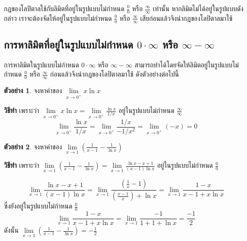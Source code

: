 \documentclass[
]{book}
\theoremstyle{definition}
\theoremstyle{definition}
\newtheorem{example}{ตัวอย่าง}[chapter]
\theoremstyle{definition}
\theoremstyle{definition}
\theoremstyle{remark}
\begin{document}
กฎของโลปิตาลใช้กับลิมิตที่อยู่ในรูปแบบไม่กำหนด \(\displaystyle \frac{0}{0}\) หรือ
\(\displaystyle \frac{\infty }{\infty }\) เท่านั้น หากลิมิตไม่ได้อยู่ในรูปแบบดังกล่าว
เราจะต้องจัดให้อยู่ในรูปแบบไม่กำหนด \(\displaystyle \frac{0}{0}\) หรือ
\(\displaystyle \frac{\infty
}{\infty }\) เสียก่อนแล้วจึงนำกฎของโลปิตาลมาใช้

\subsection{\texorpdfstring{การหาลิมิตที่อยู่ในรูปแบบไม่กำหนด \(0\cdot \infty\) หรือ \(\infty
-\infty\)}{การหาลิมิตที่อยู่ในรูปแบบไม่กำหนด 0\textbackslash cdot \textbackslash infty หรือ \textbackslash infty
-\textbackslash infty}}\label{uxe01uxe32uxe23uxe2buxe32uxe25uxe21uxe15uxe17uxe2duxe22uxe43uxe19uxe23uxe1buxe41uxe1auxe1auxe44uxe21uxe01uxe33uxe2buxe19uxe14-0cdot-infty-uxe2buxe23uxe2d-infty--infty}

การหาลิมิตในรูปแบบไม่กำหนด \(0\cdot \infty\) หรือ \(\infty -\infty\)
สามารถทำได้โดยจัดให้ลิมิตอยู่ในรูปแบบไม่กำหนด \(\displaystyle \frac{0}{0}\) หรือ
\(\displaystyle \frac{\infty }{\infty }\) ก่อนแล้วจึงนำกฎของโลปิตาลมาใช้
ดังตัวอย่างต่อไปนี้

\begin{example}
จงหาค่าของ \(\mathop {\lim }\limits_{x\to 0^+} x\ln x\)
\end{example}

\textbf{วิธีทำ} เพราะว่า
\(\displaystyle \mathop {\lim }\limits_{x\to 0^+} x\ln x=\mathop
{\lim
}\limits_{x\to 0^+} \frac{\ln x}{1/x}\) อยู่ในรูปแบบไม่กำหนด \(\displaystyle
\frac{\infty
}{\infty }\)
\[\displaystyle \mathop {\lim }\limits_{x\to 0^+} \frac{\ln x}{1/x}=\mathop 
{\lim 
}\limits_{x\to 0^+} \frac{1/x}{-1/x^2}=\mathop {\lim }\limits_{x\to 0^+} 
(-x)=0\]

\begin{example}
จงหาค่าของ \(\displaystyle \mathop {\lim }\limits_{x\to 1}
(\frac{1}{x-1}-\frac{1}{\ln x})\)
\end{example}

\textbf{วิธีทำ} เพราะว่า \(\displaystyle \mathop {\lim }\limits_{x\to 1}
(\frac{1}{x-1}-\frac{1}{\ln
x})=\mathop {\lim }\limits_{x\to 1} \frac{\ln x-x+1}{(x-1)\ln x}\)
อยู่ในรูปแบบไม่กำหนด \(\displaystyle \frac{0}{0}\)

\[\displaystyle \mathop {\lim }\limits_{x\to 1} \frac{\ln x-x+1}{(x-1)\ln 
x}=\mathop {\lim 
}\limits_{x\to 1} \frac{(\frac{1}{x}-1)}{(\frac{x-1}{x})+\ln x}=\mathop 
{\lim }\limits_{x\to 1} \frac{1-x}{x-1+x\ln x}\] ซึ่งยังอยู่ในรูปแบบไม่กำหนด
\(\displaystyle \frac{0}{0}\)
\[\displaystyle \mathop {\lim }\limits_{x\to 1} \frac{1-x}{x-1+x\ln 
x}=\mathop {\lim 
}\limits_{x\to 1} \frac{-1}{1+1+\ln x}=\frac{-1}{2}\] ดังนั้น
\(\displaystyle \mathop {\lim }\limits_{x\to 1}
(\frac{1}{x-1}-\frac{1}{\ln
x})=-\frac{1}{2}\)
\end{document}
